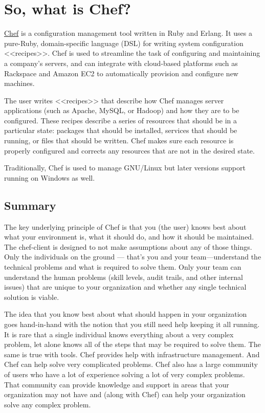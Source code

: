 \chapter{So, what is Chef?}

\begin{figure}[ht!]
  \label{fig:chef_logo}
\end{figure}

\href{http://www.getchef.com/}{Chef} is a configuration management tool written in Ruby and Erlang. It uses a pure-Ruby, domain-specific language (DSL) for writing system configuration <<recipes>>. Chef is used to streamline the task of configuring and maintaining a company's servers, and can integrate with cloud-based platforms such as Rackspace and Amazon EC2 to automatically provision and configure new machines.

The user writes <<recipes>> that describe how Chef manages server applications (such as Apache, MySQL, or Hadoop) and how they are to be configured. These recipes describe a series of resources that should be in a particular state: packages that should be installed, services that should be running, or files that should be written. Chef makes sure each resource is properly configured and corrects any resources that are not in the desired state.

Traditionally, Chef is used to manage GNU/Linux but later versions support running on Windows as well.





\section{Summary}

The key underlying principle of Chef is that you (the user) knows best about what your environment is, what it should do, and how it should be maintained. The chef-client is designed to not make assumptions about any of those things. Only the individuals on the ground — that's you and your team—understand the technical problems and what is required to solve them. Only your team can understand the human problems (skill levels, audit trails, and other internal issues) that are unique to your organization and whether any single technical solution is viable.

The idea that you know best about what should happen in your organization goes hand-in-hand with the notion that you still need help keeping it all running. It is rare that a single individual knows everything about a very complex problem, let alone knows all of the steps that may be required to solve them. The same is true with tools. Chef provides help with infrastructure management. And Chef can help solve very complicated problems. Chef also has a large community of users who have a lot of experience solving a lot of very complex problems. That community can provide knowledge and support in areas that your organization may not have and (along with Chef) can help your organization solve any complex problem.